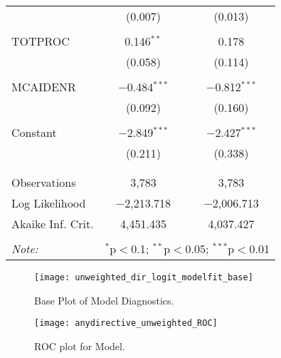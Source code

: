 \documentclass{article}
\begin{document}
\begin{appendix}
\begin{table}[h]
\begin{tabular}{@{\extracolsep{5pt}}lcc}
  & (0.007) & (0.013) \\ 
  & & \\ 
 TOTPROC & 0.146$^{**}$ & 0.178 \\ 
  & (0.058) & (0.114) \\ 
  & & \\ 
 MCAIDENR & $-$0.484$^{***}$ & $-$0.812$^{***}$ \\ 
  & (0.092) & (0.160) \\ 
  & & \\ 
 Constant & $-$2.849$^{***}$ & $-$2.427$^{***}$ \\ 
  & (0.211) & (0.338) \\ 
  & & \\ 
\hline \\[-1.8ex] 
Observations & 3,783 & 3,783 \\ 
Log Likelihood & $-$2,213.718 & $-$2,006.713 \\ 
Akaike Inf. Crit. & 4,451.435 & 4,037.427 \\ 
\hline 
\hline \\[-1.8ex] 
\textit{Note:}  & \multicolumn{2}{r}{$^{*}$p$<$0.1; $^{**}$p$<$0.05; $^{***}$p$<$0.01} \\ 
\end{tabular} 
\end{table} 

\begin{figure}[h]
\centering
\texttt{[image: unweighted\_dir\_logit\_modelfit\_base]}
\caption{Base Plot of Model Diagnostics.}
\end{figure}

\begin{figure}[h]
\centering
\texttt{[image: anydirective\_unweighted\_ROC]}
\caption{ROC plot for Model.}
\end{figure}

\end{appendix}
\end{document}
